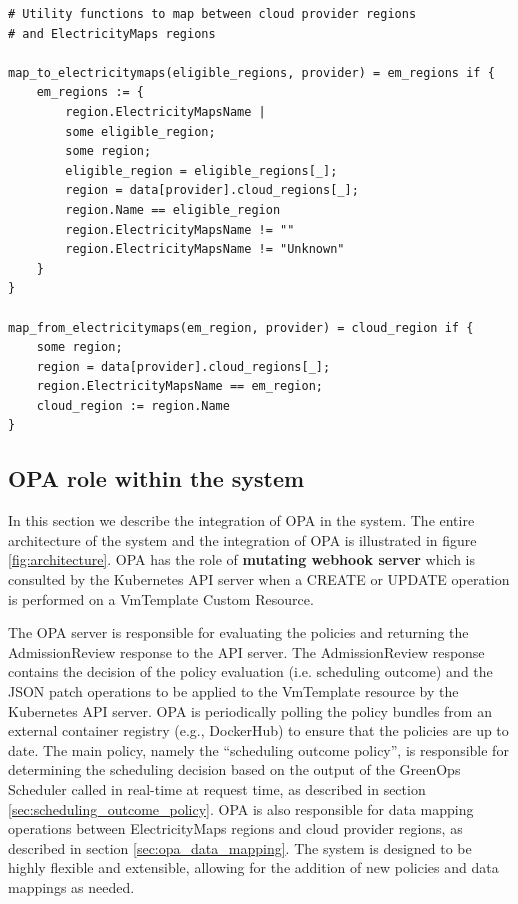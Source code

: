 \vspace{5cm}

\begin{lstlisting}[language=Rego, caption=Rego data mapping, label=lst:rego_data_mapping]
# Utility functions to map between cloud provider regions 
# and ElectricityMaps regions

map_to_electricitymaps(eligible_regions, provider) = em_regions if {
    em_regions := {
        region.ElectricityMapsName |                             
        some eligible_region;                       
        some region;                                
        eligible_region = eligible_regions[_];      
        region = data[provider].cloud_regions[_];   
        region.Name == eligible_region             
        region.ElectricityMapsName != ""            
        region.ElectricityMapsName != "Unknown"
    }
}

map_from_electricitymaps(em_region, provider) = cloud_region if {
    some region;                              
    region = data[provider].cloud_regions[_];   
    region.ElectricityMapsName == em_region;    
    cloud_region := region.Name 
}

\end{lstlisting}

\subsection{OPA role within the system}

In this section we describe the integration of OPA in the system.
The entire architecture of the system and the integration of OPA is illustrated in figure \ref{fig:architecture}.
OPA has the role of \textbf{mutating webhook server} which is consulted by the Kubernetes API server when a CREATE or UPDATE operation is performed on a VmTemplate Custom Resource.

The OPA server is responsible for evaluating the policies and returning the AdmissionReview response to the API server.
The AdmissionReview response contains the decision of the policy evaluation (i.e. scheduling outcome) and the JSON patch operations to be applied to the VmTemplate resource by the Kubernetes API server.
OPA is periodically polling the policy bundles from an external container registry (e.g., DockerHub) to ensure that the policies are up to date.
The main policy, namely the ``scheduling outcome policy'', is responsible for determining the scheduling decision based on the output of the GreenOps Scheduler called in real-time at request time, as described in section \ref{sec:scheduling_outcome_policy}.
OPA is also responsible for data mapping operations between ElectricityMaps regions and cloud provider regions, as described in section \ref{sec:opa_data_mapping}.
The system is designed to be highly flexible and extensible, allowing for the addition of new policies and data mappings as needed.

